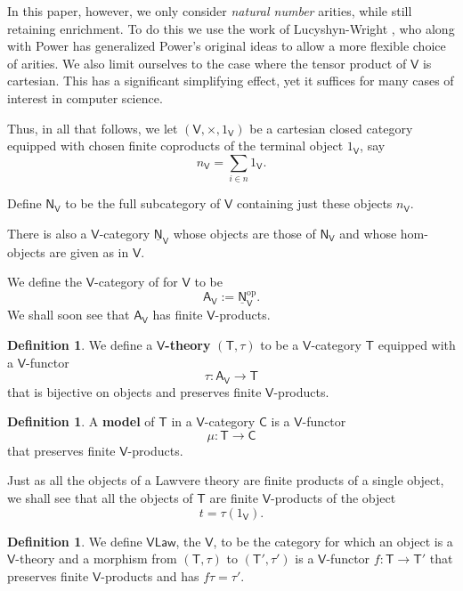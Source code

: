 \documentclass{amsart}
\newcommand{\define}[1]{{\bf \boldmath{#1}}}
\theoremstyle{definition}
\newtheorem{definition}[theorem]{Definition}
\newcommand{\Law}{\mathsf{Law}}
\newcommand{\NN}{\mathsf{N}}
\newcommand{\A}{\mathsf{A}}
\newcommand{\V}{\mathsf{V}}
\newcommand{\C}{\mathsf{C}}
\newcommand{\T}{\mathsf{T}}
\newcommand{\op}{\mathrm{op}}
\newcommand{\maps}{\colon}
\begin{document}
In this paper, however, we only consider \textit{natural number} arities, while still retaining enrichment. To do this we use the work of Lucyshyn-Wright \cite{lucyshyn-wright}, who along with Power \cite{np} has generalized Power's original ideas to allow a more flexible choice of arities.    We also limit ourselves to the case where the tensor product of $\V$ is cartesian.  This has a significant simplifying effect, yet it suffices for many cases of interest in computer science.

Thus, in all that follows, we let $(\V,\times,1_\V)$ be a cartesian closed category equipped with chosen finite coproducts of the terminal object $1_\V$, say 
\[   n_\V = \sum_{i \in n} 1_\V . \]  
\iffalse
These objects come with natural isomorphisms
\[
\V(n_\V,a) \cong\V(1_\V,a)^n .
\]
\fi
Define $\NN_\V$ to be the full subcategory of $\V$ containing just these objects $n_\V$.  
\iffalse
Since $\NN_\V$ has finite coproducts, $\NN_\V^\op$ has finite products.  
Let
\[ j \maps \NN_\V \hookrightarrow \V \]
be the inclusion.    
\fi
There is also a $\V$-category $\underline{\NN}_\V$ whose objects are those of $\NN_\V$ and whose hom-objects are given as in $\V$.   
\iffalse
\[         \NN_\V(a,b) = j(b)^{j(a)}  \]
for all $a,b \in \NN_\V$. 
\fi
We define the $\V$-category of \define{arities} for $\V$ to be 
\[             \A_\V := \underline{\NN}_\V^\op   .\]
We shall soon see that $\A_\V$ has finite $\V$-products. 

\begin{definition}
\label{defn:V-theory}
We define a \textbf{$\V$-theory} $(\T,\tau)$ to be a $\V$-category $\T$ equipped with a $\V$-functor 
\[ \tau  \maps \A_\V \to \T \]
that is bijective on objects and preserves finite $\V$-products.
\end{definition}

\begin{definition}
A \textbf{model} of $\T$ in a $\V$-category $\C$ is a $\V$-functor 
\[  \mu \maps \T \to \C \]
that preserves finite $\V$-products.
\end{definition}

Just as all the objects of a Lawvere theory are finite products of a single object, we shall see that all the objects of $\T$ are finite $\V$-products of the object 
\[   t = \tau(1_\V) .\]   

\begin{definition}
\label{defn:VLaw}
We define $\V\Law$, the \define{category of} $\V$\define{-theories}, to be the category for which an object is a $\V$-theory and a morphism from $(\T,\tau)$ to $(\T',\tau')$ is a $\V$-functor $f \maps \T \to \T'$ that preserves finite $\V$-products and has $f\tau = \tau'$.   
\end{definition}
\end{document}
